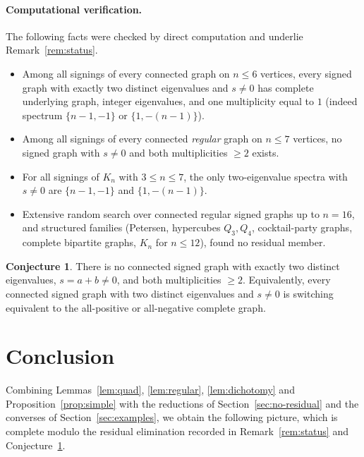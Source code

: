 \documentclass{amsart}
\theoremstyle{definition}
\newtheorem{conjecture}{Conjecture}
\begin{document}
\paragraph{Computational verification.}
The following facts were checked by direct computation and underlie
Remark~\ref{rem:status}.
\begin{itemize}
\item Among all signings of every connected graph on $n\le 6$ vertices, every
signed graph with exactly two distinct eigenvalues and $s\ne0$ has complete
underlying graph, integer eigenvalues, and one multiplicity equal to $1$
(indeed spectrum $\{n-1,-1\}$ or $\{1,-(n-1)\}$).
\item Among all signings of every connected \emph{regular} graph on $n\le 7$
vertices, no signed graph with $s\ne0$ and both multiplicities $\ge2$ exists.
\item For all signings of $K_n$ with $3\le n\le 7$, the only two-eigenvalue
spectra with $s\ne0$ are $\{n-1,-1\}$ and $\{1,-(n-1)\}$.
\item Extensive random search over connected regular signed graphs up to
$n=16$, and structured families (Petersen, hypercubes $Q_3,Q_4$,
cocktail-party graphs, complete bipartite graphs, $K_n$ for $n\le12$), found no
residual member.
\end{itemize}

\begin{conjecture}\label{conj:residual}
There is no connected signed graph with exactly two distinct eigenvalues, $s=
a+b\ne0$, and both multiplicities $\ge2$. Equivalently, every connected signed
graph with two distinct eigenvalues and $s\ne0$ is switching equivalent to the
all-positive or all-negative complete graph.
\end{conjecture}

\section{Conclusion}\label{sec:conclusion}

Combining Lemmas~\ref{lem:quad}, \ref{lem:regular}, \ref{lem:dichotomy} and
Proposition~\ref{prop:simple} with the reductions of
Section~\ref{sec:no-residual} and the converses of
Section~\ref{sec:examples}, we obtain the following picture, which is complete
modulo the residual elimination recorded in Remark~\ref{rem:status} and
Conjecture~\ref{conj:residual}.
\end{document}
